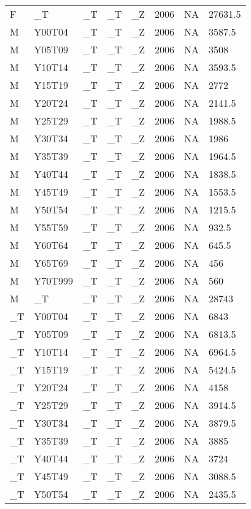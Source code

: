 \begin{longtable}[t]{llllllll}
\addlinespace
F & \_T & \_T & \_T & \_Z & 2006 & NA & 27631.5\\
M & Y00T04 & \_T & \_T & \_Z & 2006 & NA & 3587.5\\
M & Y05T09 & \_T & \_T & \_Z & 2006 & NA & 3508\\
M & Y10T14 & \_T & \_T & \_Z & 2006 & NA & 3593.5\\
M & Y15T19 & \_T & \_T & \_Z & 2006 & NA & 2772\\
\addlinespace
M & Y20T24 & \_T & \_T & \_Z & 2006 & NA & 2141.5\\
M & Y25T29 & \_T & \_T & \_Z & 2006 & NA & 1988.5\\
M & Y30T34 & \_T & \_T & \_Z & 2006 & NA & 1986\\
M & Y35T39 & \_T & \_T & \_Z & 2006 & NA & 1964.5\\
M & Y40T44 & \_T & \_T & \_Z & 2006 & NA & 1838.5\\
\addlinespace
M & Y45T49 & \_T & \_T & \_Z & 2006 & NA & 1553.5\\
M & Y50T54 & \_T & \_T & \_Z & 2006 & NA & 1215.5\\
M & Y55T59 & \_T & \_T & \_Z & 2006 & NA & 932.5\\
M & Y60T64 & \_T & \_T & \_Z & 2006 & NA & 645.5\\
M & Y65T69 & \_T & \_T & \_Z & 2006 & NA & 456\\
\addlinespace
M & Y70T999 & \_T & \_T & \_Z & 2006 & NA & 560\\
M & \_T & \_T & \_T & \_Z & 2006 & NA & 28743\\
\_T & Y00T04 & \_T & \_T & \_Z & 2006 & NA & 6843\\
\_T & Y05T09 & \_T & \_T & \_Z & 2006 & NA & 6813.5\\
\_T & Y10T14 & \_T & \_T & \_Z & 2006 & NA & 6964.5\\
\addlinespace
\_T & Y15T19 & \_T & \_T & \_Z & 2006 & NA & 5424.5\\
\_T & Y20T24 & \_T & \_T & \_Z & 2006 & NA & 4158\\
\_T & Y25T29 & \_T & \_T & \_Z & 2006 & NA & 3914.5\\
\_T & Y30T34 & \_T & \_T & \_Z & 2006 & NA & 3879.5\\
\_T & Y35T39 & \_T & \_T & \_Z & 2006 & NA & 3885\\
\addlinespace
\_T & Y40T44 & \_T & \_T & \_Z & 2006 & NA & 3724\\
\_T & Y45T49 & \_T & \_T & \_Z & 2006 & NA & 3088.5\\
\_T & Y50T54 & \_T & \_T & \_Z & 2006 & NA & 2435.5\\

\end{longtable}
